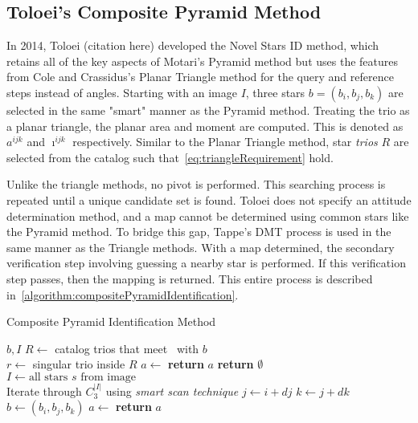 \subsection{Toloei's Composite Pyramid Method}\label{subsec:toloei'sCompositePyramidMethod}
In 2014, Toloei (citation here) developed the Novel Stars ID method, which retains all of the key aspects of Motari's
Pyramid method but uses the features from Cole and Crassidus's Planar Triangle method for the query and reference steps
instead of angles.
Starting with an image $I$, three stars $b = (b_i, b_j, b_k)$ are selected in the same "smart" manner as the Pyramid
method.
Treating the trio as a planar triangle, the planar area and moment are computed.
This is denoted as $a^{ijk}$ and $\imath^{ijk}$ respectively.
Similar to the Planar Triangle method, star \textit{trios} $R$ are selected from the catalog such
that~\autoref{eq:triangleRequirement} hold.

Unlike the triangle methods, no pivot is performed.
This searching process is repeated until a unique candidate set is found.
Toloei does not specify an attitude determination method, and a map cannot be determined using common
stars like the Pyramid method.
To bridge this gap, Tappe's DMT process is used in the same manner as the Triangle methods.
With a map determined, the secondary verification step involving guessing a nearby star is performed.
If this verification step passes, then the mapping is returned.
This entire process is described in~\autoref{algorithm:compositePyramidIdentification}.

\begin{algorithm}
    \caption{Composite Pyramid Identification Method} \label{algorithm:compositePyramidIdentification}
    \begin{algorithmic}[1]
         {$b, I$}
        \State $R \gets $ catalog trios that meet~ with $b$
        \\
        \State $r \gets $ singular trio inside $R$
        \State $a \gets $ 
        \State \textbf{return} $a$
        \EndIf
        \EndIf
        \State \textbf{return } $\emptyset$
        \EndFunction
        \\
        \State $I \gets \text{all stars } s \text{ from image}$
        \\
        \LineComment Iterate through $C^{|I|}_3$ using \textit{smart scan technique}
        \State $j \gets i + dj$
        \State $k \gets j + dk$
        \\
        \State $b \gets (b_i, b_j, b_k)$
        \State $a \gets$ 
        \State \textbf{return} $a$
        \EndIf
        \EndFor
        \EndFor
        \EndFor
        \EndProcedure
    \end{algorithmic}
\end{algorithm}


